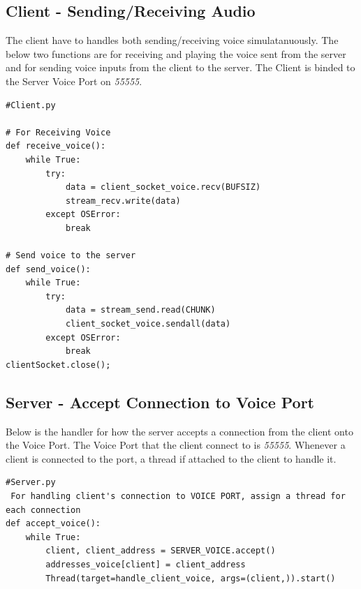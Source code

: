 \documentclass[a4paper,11pt]{article}
\begin{document}
\subsection{Client - Sending/Receiving  Audio}
The client have to handles both sending/receiving voice simulatanuously. The below two functions are for receiving and playing the voice sent from the server and for sending voice inputs from the client to the server. The Client is binded to the Server Voice Port on \textit{55555}.
\begin{mdframed}[backgroundcolor=light-gray, roundcorner=30pt,leftmargin=1, rightmargin=1, innerleftmargin=5, innertopmargin=-3,innerbottommargin=5, outerlinewidth=1, linecolor=light-gray]
\begin{lstlisting}
#Client.py

# For Receiving Voice
def receive_voice():
	while True:
		try:
			data = client_socket_voice.recv(BUFSIZ)
			stream_recv.write(data)
		except OSError:
			break

# Send voice to the server
def send_voice():
	while True:
		try:
			data = stream_send.read(CHUNK)
			client_socket_voice.sendall(data)
		except OSError:
			break
clientSocket.close();
\end{lstlisting}
\end{mdframed}

\subsection{Server - Accept Connection to Voice Port}
Below is the handler for how the server accepts a connection from the client onto the Voice Port. The Voice Port that the client connect to is \textit{55555}. Whenever a client is connected to the port, a thread if attached to the client to handle it.

\begin{mdframed}[backgroundcolor=light-gray, roundcorner=30pt,leftmargin=1, rightmargin=1, innerleftmargin=5, innertopmargin=-3,innerbottommargin=5, outerlinewidth=1, linecolor=light-gray]
\begin{lstlisting}
#Server.py
 For handling client's connection to VOICE PORT, assign a thread for each connection
def accept_voice():
	while True:
		client, client_address = SERVER_VOICE.accept()
		addresses_voice[client] = client_address
		Thread(target=handle_client_voice, args=(client,)).start()
\end{lstlisting}
\end{mdframed}
\end{document}
